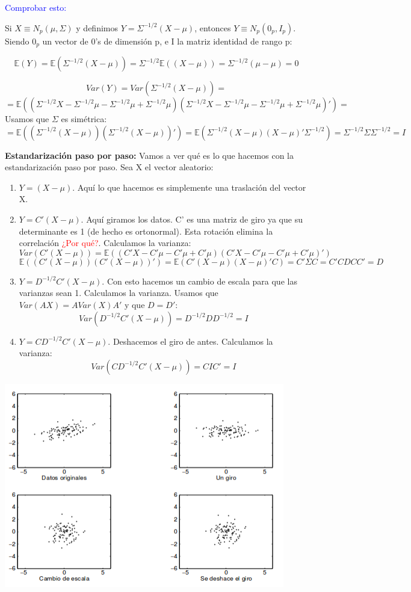 \documentclass[palatino,nochap]{apuntes}
\begin{document}
\textcolor{blue}{Comprobar esto:}
\begin{obs}
Si $X \equiv N_p(\mu, \Sigma)$ y definimos $Y = \Sigma^{-1/2}(X-\mu)$, entonces $Y\equiv N_p(0_p, I_p)$. Siendo $0_p$ un vector de 0's de dimensión p, e I la matriz identidad de rango p:
\end{obs}
\[
\mathbb{E}(Y)=\mathbb{E}\left( \Sigma^{-1/2}(X-\mu) \right) = \Sigma^{-1/2} \mathbb{E}\left( (X-\mu) \right) = \Sigma^{-1/2}(\mu -\mu)=0
\]

\[
Var(Y)=Var\left(\Sigma^{-1/2}(X-\mu) \right)=
\]
\[
=\mathbb{E}\left( \left( \Sigma^{-1/2}X-\Sigma^{-1/2}\mu-\Sigma^{-1/2}\mu+\Sigma^{-1/2}\mu \right) \left( \Sigma^{-1/2}X-\Sigma^{-1/2}\mu-\Sigma^{-1/2}\mu+\Sigma^{-1/2}\mu \right)' \right)=
\]
Usamos que $\Sigma$ es simétrica:
\[
=\mathbb{E}\left( \left( \Sigma^{-1/2}(X-\mu) \right) \left( \Sigma^{-1/2}(X-\mu) \right)' \right) = \mathbb{E}\left( \Sigma^{-1/2}(X-\mu)(X-\mu)'\Sigma^{-1/2}  \right) = \Sigma^{-1/2}\Sigma\Sigma^{-1/2} = I
\]


\textbf{Estandarización paso por paso: }Vamos a ver qué es lo que hacemos con la estandarización paso por paso. Sea X el vector aleatorio:
\begin{enumerate}
\item $Y=(X-\mu)$. Aquí lo que hacemos es simplemente una traslación del vector X. 
\item $Y=C'(X-\mu)$. Aquí giramos los datos. C' es una matriz de giro ya que su determinante es 1 (de hecho es ortonormal). Esta rotación elimina la correlación \textcolor{red}{¿Por qué?}. Calculamos la varianza:
\[
Var\left( C'(X-\mu) \right) = \mathbb{E}\left( \left( C'X-C'\mu-C'\mu+C'\mu \right) \left( C'X-C'\mu-C'\mu+C'\mu \right)' \right)
\]
\[
\mathbb{E}\left( \left( C'(X-\mu) \right) \left( C'(X-\mu) \right)' \right) = \mathbb{E}\left( C'(X-\mu)(X-\mu)'C  \right) = C'\Sigma C=C'CDCC'=D
\]
\item $Y=D^{-1/2}C'(X-\mu)$. Con esto hacemos un cambio de escala para que las varianzas sean 1. Calculamos la varianza. Usamos que $Var(AX)=AVar(X)A'$ y que $D=D'$:
\[
Var\left( D^{-1/2}C'(X-\mu) \right) = D^{-1/2}DD^{-1/2} = I
\]
\item $Y=CD^{-1/2}C'(X-\mu)$. Deshacemos el giro de antes. Calculamos la varianza:
\[
Var\left( CD^{-1/2}C'(X-\mu) \right)=CIC' = I
\]
\end{enumerate}
\includegraphics[scale=0.75]{img/estandarizacionMultivariante.png}
\end{document}
